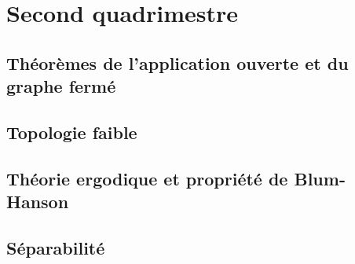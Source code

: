 \documentclass[a4paper, 12pt]{book}
\theoremstyle{definition} \newtheorem{df}{D\'{e}finition}[chapter]
\theoremstyle{definition} \newtheorem{ex}[df]{Exemple}
\theoremstyle{definition} \newtheorem{thm}[df]{Th\'{e}or\`{e}me}
\theoremstyle{definition} \newtheorem{cor}[df]{Corollaire}
\theoremstyle{definition} \newtheorem{lem}[df]{Lemme}
\theoremstyle{definition} \newtheorem{prop}[df]{Proposition}
\theoremstyle{definition} \newtheorem{rem}[df]{Remarque}
\theoremstyle{definition} \newtheorem{exo}{Exercice}[chapter]
\begin{document}
\part{Second quadrimestre}
\chapter{Théorèmes de l'application ouverte et du graphe fermé}



\chapter{Topologie faible}


\chapter{Théorie ergodique et propriété de Blum-Hanson}


\chapter{Séparabilité}

\appendix




\end{document}
